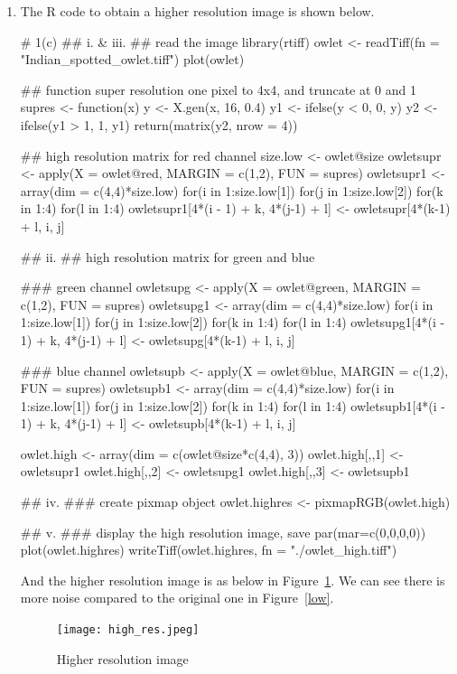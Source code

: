\documentclass{article}
\begin{document}
\begin{enumerate}[leftmargin = 0 em, label = \arabic*., font = \bfseries]
\begin{enumerate}
				\item The R code to obtain a higher resolution image is shown below.
				\begin{rcode}
# 1(c) 
## i. & iii.
## read the image
library(rtiff)
owlet <- readTiff(fn = "Indian_spotted_owlet.tiff")
plot(owlet)



## function super resolution one pixel to 4x4, and truncate at 0 and 1
supres <- function(x){
  y <- X.gen(x, 16, 0.4)
  y1 <- ifelse(y < 0, 0, y)
  y2 <- ifelse(y1 > 1, 1, y1)
  return(matrix(y2, nrow = 4))
}

## high resolution matrix for red channel
size.low <- owlet@size
owletsupr <- apply(X = owlet@red, MARGIN = c(1,2), FUN = supres)
owletsupr1 <- array(dim = c(4,4)*size.low)
for(i in 1:size.low[1]){
  for(j in 1:size.low[2]){
    for(k in 1:4){
      for(l in 1:4){
        owletsupr1[4*(i - 1) + k, 4*(j-1) + l] <- owletsupr[4*(k-1) + l, i, j]
      }
    }
  }
}

## ii.
## high resolution matrix for green and blue

### green channel
owletsupg <- apply(X = owlet@green, MARGIN = c(1,2), FUN = supres)
owletsupg1 <- array(dim = c(4,4)*size.low)
for(i in 1:size.low[1]){
  for(j in 1:size.low[2]){
    for(k in 1:4){
      for(l in 1:4){
        owletsupg1[4*(i - 1) + k, 4*(j-1) + l] <- owletsupg[4*(k-1) + l, i, j]
      }
    }
  }
}

### blue channel
owletsupb <- apply(X = owlet@blue, MARGIN = c(1,2), FUN = supres)
owletsupb1 <- array(dim = c(4,4)*size.low)
for(i in 1:size.low[1]){
  for(j in 1:size.low[2]){
    for(k in 1:4){
      for(l in 1:4){
        owletsupb1[4*(i - 1) + k, 4*(j-1) + l] <- owletsupb[4*(k-1) + l, i, j]
      }
    }
  }
}



owlet.high <- array(dim  = c(owlet@size*c(4,4), 3))
owlet.high[,,1] <- owletsupr1
owlet.high[,,2] <- owletsupg1
owlet.high[,,3] <- owletsupb1

## iv.
### create pixmap object
owlet.highres <- pixmapRGB(owlet.high)

## v.
### display the high resolution image, save
par(mar=c(0,0,0,0))
plot(owlet.highres)
writeTiff(owlet.highres, fn = "./owlet_high.tiff")
				\end{rcode}
				\newpage
				And the higher resolution image is as below in Figure~\ref{high}. We can see there is more noise compared to the original one in Figure~\ref{low}.
				\begin{figure}[!htb]
				\centering
				\texttt{[image: high\_res.jpeg]}
				\caption{Higher resolution image}
				\label{high}
				\end{figure}


\end{enumerate}
\end{enumerate}
\end{document}

